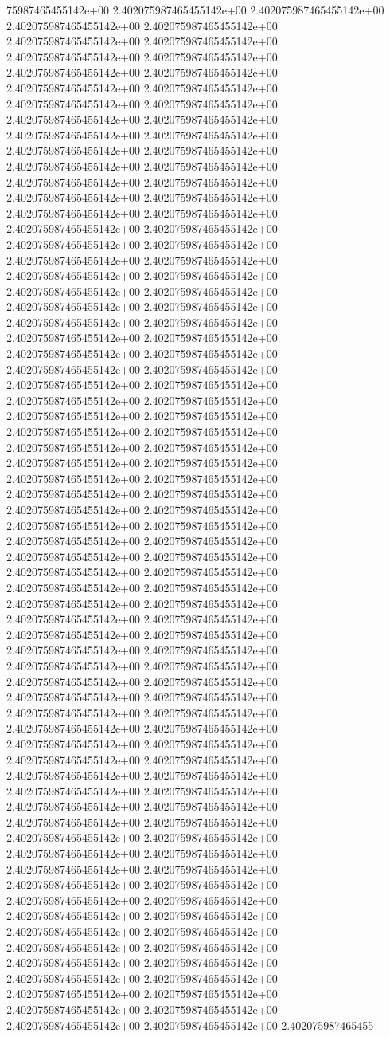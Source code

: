 75987465455142e+00	2.402075987465455142e+00	2.402075987465455142e+00	2.402075987465455142e+00	2.402075987465455142e+00	2.402075987465455142e+00	2.402075987465455142e+00	2.402075987465455142e+00	2.402075987465455142e+00	2.402075987465455142e+00	2.402075987465455142e+00	2.402075987465455142e+00	2.402075987465455142e+00	2.402075987465455142e+00	2.402075987465455142e+00	2.402075987465455142e+00	2.402075987465455142e+00	2.402075987465455142e+00	2.402075987465455142e+00	2.402075987465455142e+00	2.402075987465455142e+00	2.402075987465455142e+00	2.402075987465455142e+00	2.402075987465455142e+00	2.402075987465455142e+00	2.402075987465455142e+00	2.402075987465455142e+00	2.402075987465455142e+00	2.402075987465455142e+00	2.402075987465455142e+00	2.402075987465455142e+00	2.402075987465455142e+00	2.402075987465455142e+00	2.402075987465455142e+00	2.402075987465455142e+00	2.402075987465455142e+00	2.402075987465455142e+00	2.402075987465455142e+00	2.402075987465455142e+00	2.402075987465455142e+00	2.402075987465455142e+00	2.402075987465455142e+00	2.402075987465455142e+00	2.402075987465455142e+00	2.402075987465455142e+00	2.402075987465455142e+00	2.402075987465455142e+00	2.402075987465455142e+00	2.402075987465455142e+00	2.402075987465455142e+00	2.402075987465455142e+00	2.402075987465455142e+00	2.402075987465455142e+00	2.402075987465455142e+00	2.402075987465455142e+00	2.402075987465455142e+00	2.402075987465455142e+00	2.402075987465455142e+00	2.402075987465455142e+00	2.402075987465455142e+00	2.402075987465455142e+00	2.402075987465455142e+00	2.402075987465455142e+00	2.402075987465455142e+00	2.402075987465455142e+00	2.402075987465455142e+00	2.402075987465455142e+00	2.402075987465455142e+00	2.402075987465455142e+00	2.402075987465455142e+00	2.402075987465455142e+00	2.402075987465455142e+00	2.402075987465455142e+00	2.402075987465455142e+00	2.402075987465455142e+00	2.402075987465455142e+00	2.402075987465455142e+00	2.402075987465455142e+00	2.402075987465455142e+00	2.402075987465455142e+00	2.402075987465455142e+00	2.402075987465455142e+00	2.402075987465455142e+00	2.402075987465455142e+00	2.402075987465455142e+00	2.402075987465455142e+00	2.402075987465455142e+00	2.402075987465455142e+00	2.402075987465455142e+00	2.402075987465455142e+00	2.402075987465455142e+00	2.402075987465455142e+00	2.402075987465455142e+00	2.402075987465455142e+00	2.402075987465455142e+00	2.402075987465455142e+00	2.402075987465455142e+00	2.402075987465455142e+00	2.402075987465455142e+00	2.402075987465455142e+00	2.402075987465455142e+00	2.402075987465455142e+00	2.402075987465455142e+00	2.402075987465455142e+00	2.402075987465455142e+00	2.402075987465455142e+00	2.402075987465455142e+00	2.402075987465455142e+00	2.402075987465455142e+00	2.402075987465455142e+00	2.402075987465455142e+00	2.402075987465455142e+00	2.402075987465455142e+00	2.402075987465455142e+00	2.402075987465455142e+00	2.402075987465455142e+00	2.402075987465455142e+00	2.402075987465455142e+00	2.402075987465455142e+00	2.402075987465455142e+00	2.402075987465455142e+00	2.402075987465455142e+00	2.402075987465455142e+00	2.402075987465455142e+00	2.402075987465455142e+00	2.402075987465455142e+00	2.402075987465455142e+00	2.402075987465455142e+00	2.402075987465455142e+00	2.402075987465455142e+00	2.402075987465455142e+00	2.402075987465455142e+00	2.402075987465455142e+00	2.402075987465455